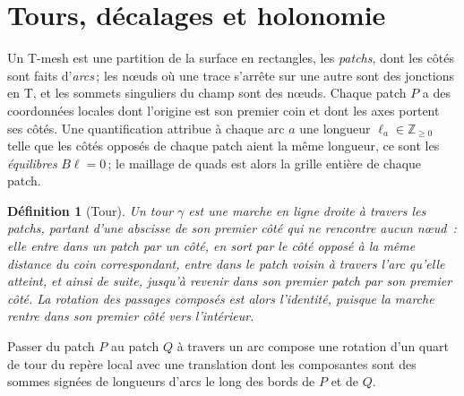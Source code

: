 \documentclass[11pt,a4paper]{article}
\newtheorem{definition}{Définition}
\newcommand{\Z}{\mathbb{Z}}
\begin{document}
\section{Tours, décalages et holonomie}\label{sec:setting}

Un T-mesh est une partition de la surface en rectangles, les \emph{patchs},
dont les côtés sont faits d'\emph{arcs}\,; les nœuds où une trace s'arrête sur
une autre sont des jonctions en T, et les sommets singuliers du champ sont des
nœuds. Chaque patch $P$ a des coordonnées locales dont l'origine est son
premier coin et dont les axes portent ses côtés. Une quantification attribue à
chaque arc $a$ une longueur $\ell_a \in \Z_{\ge 0}$ telle que les côtés
opposés de chaque patch aient la même longueur, ce sont les
\emph{équilibres} $B\ell = 0$\,; le maillage de quads est alors la grille
entière de chaque patch.

\begin{definition}[Tour]
Un \emph{tour} $\gamma$ est une marche en ligne droite à travers les patchs,
partant d'une abscisse de son premier côté qui ne rencontre aucun nœud~: elle
entre dans un patch par un côté, en sort par le côté opposé à la même distance
du coin correspondant, entre dans le patch voisin à travers l'arc qu'elle
atteint, et ainsi de suite, jusqu'à revenir dans son premier patch par son
premier côté. La rotation des passages composés est alors l'identité,
puisque la marche rentre dans son premier côté vers l'intérieur.
\end{definition}

Passer du patch $P$ au patch $Q$ à travers un arc compose une rotation d'un
quart de tour du repère local avec une translation dont les composantes sont
des sommes signées de longueurs d'arcs le long des bords de $P$ et de $Q$.
\end{document}
